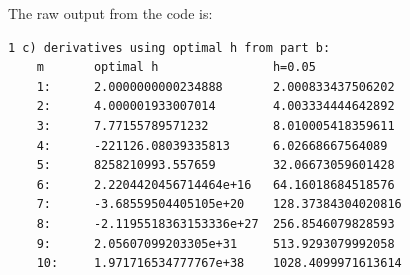 \documentclass{article}
\begin{document}
\begin{enumerate}
\begin{enumerate}
    The raw output from the code is:
\begin{verbatim}
1 c) derivatives using optimal h from part b: 
    m       optimal h                h=0.05
    1:      2.0000000000234888       2.000833437506202
    2:      4.000001933007014        4.003334444642892
    3:      7.77155789571232         8.010005418359611
    4:      -221126.08039335813      6.02668667564089
    5:      8258210993.557659        32.06673059601428
    6:      2.2204420456714464e+16   64.16018684518576
    7:      -3.68559504405105e+20    128.37384304020816
    8:      -2.1195518363153336e+27  256.8546079828593
    9:      2.05607099203305e+31     513.9293079992058
    10:     1.971716534777767e+38    1028.4099971613614
\end{verbatim}
\end{enumerate}


\end{enumerate}
\end{document}
